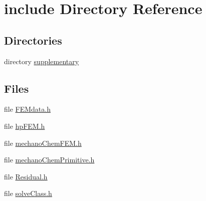 \section{include Directory Reference}
\label{dir_d44c64559bbebec7f509842c48db8b23}
\subsection*{Directories}
\begin{DoxyCompactItemize}
\item 
directory \mbox{\hyperlink{dir_f13e45982086ecf749e6111b0e6a29af}{supplementary}}
\end{DoxyCompactItemize}
\subsection*{Files}
\begin{DoxyCompactItemize}
\item 
file \mbox{\hyperlink{_f_e_mdata_8h}{F\+E\+Mdata.\+h}}
\item 
file \mbox{\hyperlink{hp_f_e_m_8h}{hp\+F\+E\+M.\+h}}
\item 
file \mbox{\hyperlink{mechano_chem_f_e_m_8h}{mechano\+Chem\+F\+E\+M.\+h}}
\item 
file \mbox{\hyperlink{mechano_chem_primitive_8h}{mechano\+Chem\+Primitive.\+h}}
\item 
file \mbox{\hyperlink{_residual_8h}{Residual.\+h}}
\item 
file \mbox{\hyperlink{solve_class_8h}{solve\+Class.\+h}}
\end{DoxyCompactItemize}
